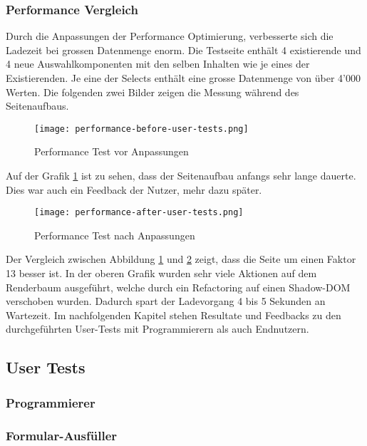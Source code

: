 \subsubsection{Performance Vergleich}

Durch die Anpassungen der Performance Optimierung, verbesserte sich die Ladezeit bei grossen Datenmenge enorm.
Die Testseite enthält 4 existierende und 4 neue Auswahlkomponenten mit den selben Inhalten wie je eines der Existierenden.
Je eine der Selects enthält eine grosse Datenmenge von über 4'000 Werten.
Die folgenden zwei Bilder zeigen die Messung während des Seitenaufbaus.

\begin{figure}[!htb]
    \centering
    \texttt{[image: performance-before-user-tests.png]}
    \caption{Performance Test vor Anpassungen}
    \label{Abbildung:PerformanceTestBefore}
\end{figure}

Auf der Grafik \ref{Abbildung:PerformanceTestBefore} ist zu sehen, dass der Seitenaufbau anfangs sehr lange dauerte.
Dies war auch ein Feedback der Nutzer, mehr dazu später.

\begin{figure}[!htb]
    \centering
    \texttt{[image: performance-after-user-tests.png]}
    \caption{Performance Test nach Anpassungen}
    \label{Abbildung:PerformanceTestAfter}
\end{figure}

Der Vergleich zwischen Abbildung \ref{Abbildung:PerformanceTestBefore} und \ref{Abbildung:PerformanceTestAfter} zeigt, dass die Seite um einen Faktor 13 besser ist.
In der oberen Grafik wurden sehr viele Aktionen auf dem Renderbaum ausgeführt, welche durch ein Refactoring auf einen Shadow-DOM verschoben wurden.
Dadurch spart der Ladevorgang 4 bis 5 Sekunden an Wartezeit.
Im nachfolgenden Kapitel stehen Resultate und Feedbacks zu den durchgeführten User-Tests mit Programmierern als auch Endnutzern.


\subsection{User Tests}


\subsubsection{Programmierer}



\subsubsection{Formular-Ausfüller}



